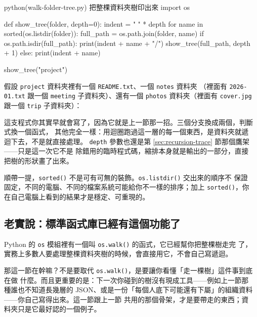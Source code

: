 \begin{example}{python}{(walk-folder-tree.py) 把整棵資料夾樹印出來}
import os


def show_tree(folder, depth=0):
    indent = "    " * depth
    for name in sorted(os.listdir(folder)):
        full_path = os.path.join(folder, name)
        if os.path.isdir(full_path):
            print(indent + name + "/")
            show_tree(full_path, depth + 1)
        else:
            print(indent + name)


show_tree("project")
\end{example}

假設 \texttt{project} 資料夾裡有一個 \texttt{README.txt}、一個 \texttt{notes} 資料夾
（裡面有 \texttt{2026-01.txt} 跟一個 \texttt{meeting} 子資料夾）、還有一個
\texttt{photos} 資料夾（裡面有 \texttt{cover.jpg} 跟一個 \texttt{trip} 子資料夾）：


這支程式你其實早就會寫了，因為它就是上一節那一招。三個分支換成兩個，判斷式換一個函式，
其他完全一樣：用迴圈跑過這一層的每一個東西，是資料夾就遞迴下去，不是就直接處理。
\texttt{depth} 參數也還是第 \ref{sec:recursion-trace} 節那個鷹架——只是這一次它不是
除錯用的臨時程式碼，縮排本身就是輸出的一部分，直接把樹的形狀畫了出來。

順帶一提，\texttt{sorted()} 不是可有可無的裝飾。\texttt{os.listdir()} 交出來的順序不
保證固定，不同的電腦、不同的檔案系統可能給你不一樣的排序；加上 \texttt{sorted()}，你
在自己電腦上看到的結果才是穩定、可重現的。

\subsection*{老實說：標準函式庫已經有這個功能了}

Python 的 \texttt{os} 模組裡有一個叫 \texttt{os.walk()} 的函式，它已經幫你把整棵樹走完
了，實務上多數人要處理整棵資料夾樹的時候，會直接用它，不會自己寫遞迴。

那這一節在幹嘛？不是要取代 \texttt{os.walk()}，是要讓你看懂「走一棵樹」這件事到底在做
什麼。而且更重要的是：下一次你碰到的樹沒有現成工具——例如上一節那種誰也不知道長幾層的
JSON、或是一份「每個人底下可能還有下屬」的組織資料——你自己寫得出來。這一節跟上一節
共用的那個骨架，才是要帶走的東西；資料夾只是它最好認的一個例子。


